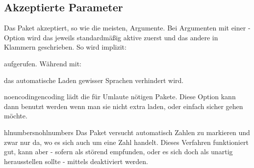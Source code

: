 \documentclass{sopra-base}
\begin{document}
%
%
%
%

\subsection{Akzeptierte Parameter}
    Das Paket akzeptiert, so wie die meisten, Argumente. 
    Bei Argumenten mit einer -Option wird das jeweils standardmäßig aktive zuerst und das andere in Klammern
    geschrieben. So wird implizit:
\begin{plainlatex}[autogobble]
    \usepackage[noencoding,hlnumbers,loadlangs,guardspace]{sopra-listings}
\end{plainlatex}
    aufgerufen. Während mit:
\begin{plainlatex}[autogobble]
    \usepackage[noloadlangs]{sopra-listings}
\end{plainlatex}
    das automatische Laden gewisser Sprachen verhindert wird.

    \begin{argument}{noencoding}{encoding}
        \label{mrk:encoding} lädt die für Umlaute nötigen Pakete. Diese Option kann dann benutzt werden wenn man sie nicht extra laden, oder einfach sicher gehen möchte.
    \end{argument}

    \begin{argument}{hlnumbers}{nohlnumbers}
        Das Paket versucht automatisch Zahlen zu markieren und zwar nur da, wo es sich auch um eine Zahl handelt. Dieses Verfahren funktioniert gut, kann aber - sofern als störend empfunden, oder es sich doch als unartig herausstellen sollte - mittels  deaktiviert werden.
    \end{argument}
\end{document}
